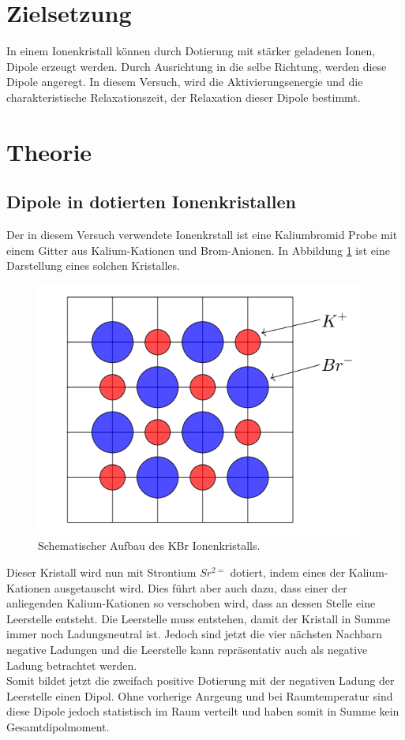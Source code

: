 \section{Zielsetzung}
In einem Ionenkristall können durch Dotierung mit stärker geladenen Ionen, Dipole erzeugt werden. 
Durch Ausrichtung in die selbe Richtung, werden diese Dipole angeregt.
In diesem Versuch, wird die Aktivierungsenergie und die charakteristische Relaxationszeit, der Relaxation dieser Dipole bestimmt.


\section{Theorie}
	\subsection{Dipole in dotierten Ionenkristallen}
		Der in diesem Versuch verwendete Ionenkrstall ist eine Kaliumbromid Probe mit einem Gitter aus Kalium-Kationen und Brom-Anionen.
		In Abbildung \ref{fig:KBr} ist eine Darstellung eines solchen Kristalles.
		\begin{figure}
			\centering
			\includegraphics[]{latex/images/Kristall.PNG}
			\caption{Schematischer Aufbau des KBr Ionenkristalls.}
			\label{fig:KBr}
		\end{figure}
		Dieser Kristall wird nun mit Strontium $Sr^{2=}$ dotiert, indem eines der Kalium-Kationen ausgetauscht wird.
		Dies führt aber auch dazu, dass einer der anliegenden Kalium-Kationen so verschoben wird, dass an dessen Stelle eine Leerstelle entsteht.
		Die Leerstelle muss entstehen, damit der Kristall in Summe immer noch Ladungsneutral ist.
		Jedoch sind jetzt die vier nächsten Nachbarn negative Ladungen und die Leerstelle kann repräsentativ auch als negative Ladung betrachtet werden.\\
		Somit bildet jetzt die zweifach positive Dotierung mit der negativen Ladung der Leerstelle einen Dipol. 
		Ohne vorherige Anrgeung und bei Raumtemperatur sind diese Dipole jedoch statistisch im Raum verteilt und haben somit in Summe kein Gesamtdipolmoment. 

